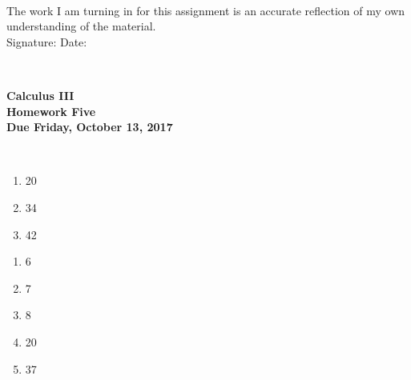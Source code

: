 \documentclass[12pt]{article}
\begin{document}
\\

\bigskip
\bigskip
\bigskip
\bigskip
\bigskip
\bigskip
\noindent The work I am turning in for this assignment is an accurate
reflection of my own understanding of the material.\\[14pt]

\noindent Signature: \underline{\hspace{7cm}} \hspace{1cm} Date:
\underline{\hspace{5cm}} 


\hspace{2mm}\\
\newpage



 
\begin{center}
{\large {\bf Calculus III}}\\
\medskip
{\large {\bf Homework Five}}\\
\medskip
{ {\bf Due Friday, October 13, 2017}}\\
\end{center}

\hspace{2mm}\\



\begin{enumerate}
\setlength{\itemsep}{-1mm}
  \item 20
  \item 34
  \item 42
\end{enumerate}


\begin{enumerate}
\setlength{\itemsep}{-1mm}
  \item 6
  \item 7
  \item 8
  \item 20
  \item 37
\end{enumerate}
\end{document}
